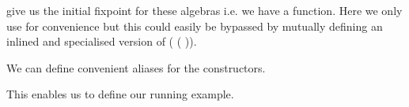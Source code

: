 give us the initial fixpoint for these algebras i.e.
we have a  function. Here we only use \assertTotal
for convenience but this could easily be bypassed by mutually defining
an inlined and specialised version of
( ( )).


We can define convenient aliases for the  constructors.


This enables us to define our running example.

